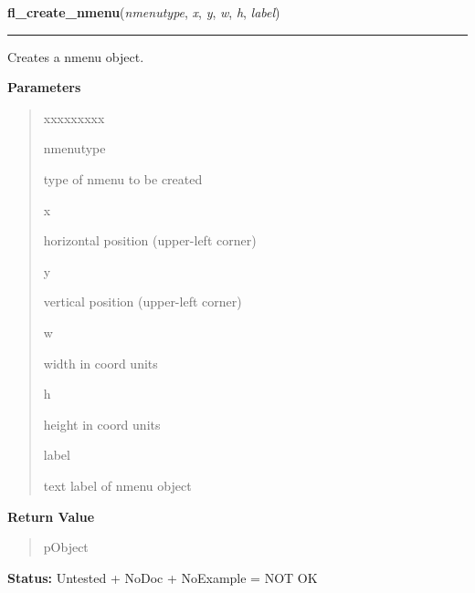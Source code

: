 \hspace{.8\funcindent}\begin{boxedminipage}{\funcwidth}

    \raggedright \textbf{fl\_create\_nmenu}(\textit{nmenutype}, \textit{x}, \textit{y}, \textit{w}, \textit{h}, \textit{label})

    \vspace{-1.5ex}

    \rule{\textwidth}{0.5\fboxrule}
\setlength{\parskip}{2ex}
    Creates a nmenu object.

\setlength{\parskip}{1ex}
      \textbf{Parameters}
      \vspace{-1ex}

      \begin{quote}
        \begin{Ventry}{xxxxxxxxx}

          \item[nmenutype]

          type of nmenu to be created

          \item[x]

          horizontal position (upper-left corner)

          \item[y]

          vertical position (upper-left corner)

          \item[w]

          width in coord units

          \item[h]

          height in coord units

          \item[label]

          text label of nmenu object

        \end{Ventry}

      \end{quote}

      \textbf{Return Value}
    \vspace{-1ex}

      \begin{quote}
      pObject

      \end{quote}

\textbf{Status:} Untested + NoDoc + NoExample = NOT OK



    \end{boxedminipage}

